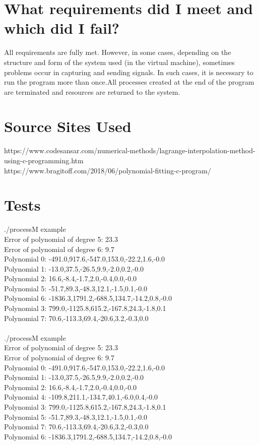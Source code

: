 \documentclass{article}
\begin{document}
\section{What requirements did I meet and which did I fail?}
\quad All requirements are fully met. However, in some cases, depending on the structure and form of the system used (in the virtual machine), sometimes problems occur in capturing and sending signals. In such cases, it is necessary to run the program more than once.All processes created at the end of the program are terminated and resources are returned to the system.\\



\section{Source Sites Used}
\quad https://www.codesansar.com/numerical-methods/lagrange-interpolation-method-using-c-programming.htm\\
https://www.bragitoff.com/2018/06/polynomial-fitting-c-program/\\

\section{Tests}
 ./processM example\\
Error of polynomial of degree 5: 23.3\\
Error of polynomial of degree 6: 9.7\\
Polynomial 0: -491.0,917.6,-547.0,153.0,-22.2,1.6,-0.0\\
Polynomial 1: -13.0,37.5,-26.5,9.9,-2.0,0.2,-0.0\\
Polynomial 2: 16.6,-8.4,-1.7,2.0,-0.4,0.0,-0.0\\
Polynomial 5: -51.7,89.3,-48.3,12.1,-1.5,0.1,-0.0\\
Polynomial 6: -1836.3,1791.2,-688.5,134.7,-14.2,0.8,-0.0\\
Polynomial 3: 799.0,-1125.8,615.2,-167.8,24.3,-1.8,0.1\\
Polynomial 7: 70.6,-113.3,69.4,-20.6,3.2,-0.3,0.0\\
\\
./processM example\\
Error of polynomial of degree 5: 23.3\\
Error of polynomial of degree 6: 9.7\\
Polynomial 0: -491.0,917.6,-547.0,153.0,-22.2,1.6,-0.0\\
Polynomial 1: -13.0,37.5,-26.5,9.9,-2.0,0.2,-0.0\\
Polynomial 2: 16.6,-8.4,-1.7,2.0,-0.4,0.0,-0.0\\
Polynomial 4: -109.8,211.1,-134.7,40.1,-6.0,0.4,-0.0\\
Polynomial 3: 799.0,-1125.8,615.2,-167.8,24.3,-1.8,0.1\\
Polynomial 5: -51.7,89.3,-48.3,12.1,-1.5,0.1,-0.0\\
Polynomial 7: 70.6,-113.3,69.4,-20.6,3.2,-0.3,0.0\\
Polynomial 6: -1836.3,1791.2,-688.5,134.7,-14.2,0.8,-0.0\\
\end{document}
